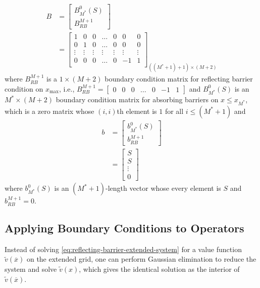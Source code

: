 \documentclass[11pt]{article}
\theoremstyle{definition}
\begin{document}
\begin{align}
B &=
\begin{bmatrix}
B_{M^*}^0 (S) \\ 
B_{RB}^{M+1}
\end{bmatrix}
\\
&=
\begin{bmatrix}
1 & 0 & 0 & \dots & 0 & 0 & 0 \\
0 & 1 & 0 & \dots & 0 & 0 & 0 \\
\vdots & \vdots & \vdots & \vdots & \vdots & \vdots & \vdots \\
0 & 0 & 0 & \dots & 0 & -1 & 1\\
\end{bmatrix}_{((M^* + 1) + 1) \times (M+2)} 
\end{align}
where $B_{RB}^{M+1}$ is a $1 \times (M+2)$ boundary condition matrix for reflecting barrier condition on $x_{\max}$, i.e., $B_{RB}^{M+1} = \begin{bmatrix}
0& 0& 0 &\dots & 0 & -1 & 1
\end{bmatrix}$ and $B_{M^*}^0 (S)$ is an $M^* \times (M+2)$ boundary condition matrix for absorbing barriers on $x \leq x_{M^*}$, which is a zero matrix whose $(i,i)$th element is $1$ for all $i \leq (M^* + 1)$ and
\begin{align}
b &= \begin{bmatrix}
b_{M^*}^0 (S) \\ 
b_{RB}^{M+1}
\end{bmatrix}\\
&= \begin{bmatrix}
S \\
S \\
\vdots \\
0
\end{bmatrix}
\end{align}
where $b^0_{M^*} (S)$ is an $(M^* + 1)$-length vector whose every element is $S$ and $b_{RB}^{M+1} = 0$.

\subsection{Applying Boundary Conditions to Operators}\label{subsec:applying-bc}
Instead of solving \eqref{eq:reflecting-barrier-extended-system} for a value function $\tilde{v}(\overline{x})$ on the extended grid, one can perform Gaussian elimination to reduce the system and solve $\tilde{v}(x)$, which gives the identical solution as the interior of $\tilde{v}(\overline{x})$.
\end{document}

